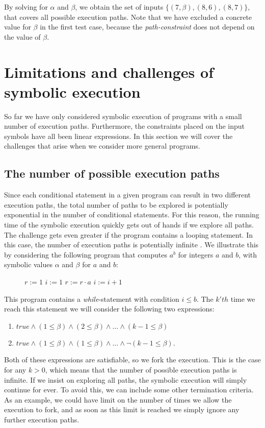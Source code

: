 	By solving for $\alpha$ and $\beta$, we obtain the set of inputs $\{(7, \beta), (8,6), (8, 7)\}$, that covers all possible execution paths. Note that we have excluded a concrete value for $\beta$ in the first test case, because the \emph{path-constraint} does not depend on the value of $\beta$. 
	 
	\fi 
\section{Limitations and challenges of symbolic execution}
	So far we have only considered symbolic execution of programs with a small number of execution paths. Furthermore, the constraints placed on the input symbols have all been linear expressions.
	In this section we will cover the challenges that arise when we consider more general programs.
	
	\subsection{The number of possible execution paths} 
		Since each conditional statement in a given program can result in two different execution paths, the total number of paths to be explored is potentially exponential in the number of conditional statements. 
		For this reason, the running time of the symbolic execution quickly gets out of hands if we explore all paths. 
		 The challenge gets even greater if the program contains a looping statement. In this case, the number of execution paths is potentially infinite \cite{CadarSen13}.
		  We illustrate this by considering the following program that computes $a^b$ for integers $a$ and $b$, with symbolic values $\alpha$ and $\beta$ for $a$ and $b$:
		\begin{figure}[!h]
			\begin{algorithmic}
				\State $r := 1$
				\State $i := 1$
					\State $ r := r\cdot a$
					\State $ i := i + 1$
				\EndWhile
				\State {}
				\EndProcedure
			\end{algorithmic}
		\end{figure}
		\pow{}
		
	This program contains a \textsl{while}-statement with condition $i \leq b$. The $k'th$ time we reach this statement we will consider the following two expressions:
	\begin{enumerate}
		\item $true \land (1 \leq \beta) \land (2 \leq \beta) \land \ldots \land (k-1 \leq \beta) $
		\item $true \land (1 \leq \beta) \land (1 \leq \beta) \land \ldots \land \neg (k-1 \leq \beta) $.
	\end{enumerate}
	Both of these expressions are satisfiable, so we fork the execution. This is the case for any $k > 0$, which means that the number of possible execution paths is infinite. If we insist on exploring all paths, the symbolic execution will simply continue for ever. To avoid this, we can include some other termination criteria. As an example, we could have limit on the number of times we allow the execution to fork, and as soon as this limit is reached we simply ignore any further execution paths.
	
